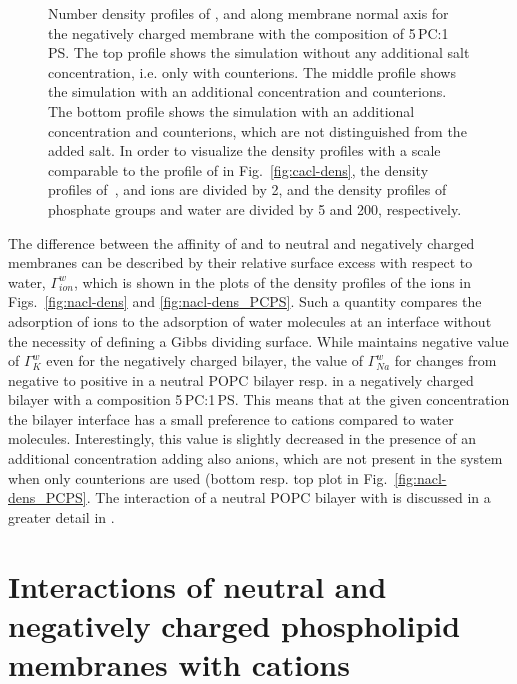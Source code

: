 \begin{figure}[tbp!]
{    Number density profiles of ,  and  along membrane normal axis 
    for the negatively charged membrane with the composition of 5\,PC:1\,PS. 
    The top profile shows the simulation without any additional salt concentration, i.e. only with  counterions. 
    The middle profile shows the simulation with an additional  concentration and  counterions. 
    The bottom profile shows the simulation with an additional  concentration and  counterions, which are not distinguished from the added salt. 
    In order to visualize the density profiles with a scale comparable to the profile of  in Fig.~\ref{fig:cacl-dens},  
    the density profiles of~,  and  ions are divided by 2, and 
    the density profiles of phosphate groups and water are divided by 5 and 200, respectively.  
    } 
\end{figure} 



The difference between the affinity of  and  to neutral and negatively charged membranes
can be described by their relative surface excess with respect to water, $\Gamma ^{w} _{ion}$, 
which is shown in the plots of the density profiles of the ions in Figs.~\ref{fig:nacl-dens} and \ref{fig:nacl-dens_PCPS}. 
Such a quantity compares the adsorption of ions to the adsorption of water molecules at an interface 
without the necessity of defining a Gibbs dividing surface. \citep{chattorajBOOK}
While  maintains negative value of $\Gamma^{w}_{K}$ even for the negatively charged bilayer,
the value of $\Gamma^{w}_{Na}$ for  changes from negative to positive
in a neutral POPC bilayer resp. in a negatively charged bilayer with a composition 5\,PC:1\,PS.
This means that at the given concentration the bilayer interface has a small preference to  cations compared to water molecules. 
Interestingly, this value is slightly decreased in the presence of an additional  concentration adding also  anions, 
which are not present in the system when only counterions are used
(bottom resp. top plot in Fig.~\ref{fig:nacl-dens_PCPS}. 
The interaction of a neutral POPC bilayer with  is discussed in a greater detail in \citep{melcr18}. 

 





 
 


\section{Interactions of neutral and negatively charged phospholipid membranes with  cations}
\label{section:lip-ion_ca}



